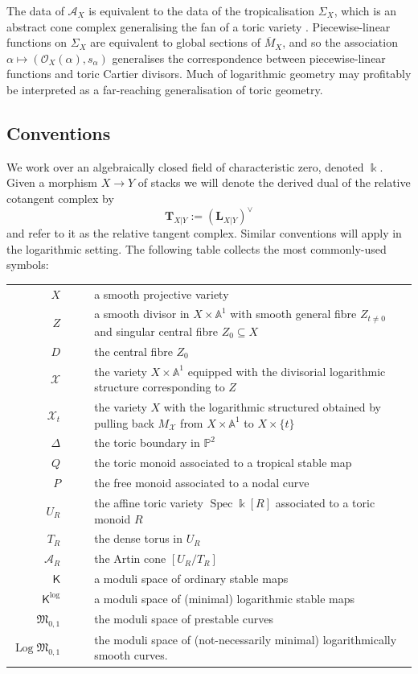 \documentclass[11pt]{amsart}
\theoremstyle{definition}
\theoremstyle{definition}
\newcommand{\LL}{\mathbf{L}}
\newcommand{\TT}{\mathbf{T}}
\newcommand{\Aaff}{\mathbb{A}}
\newcommand{\PP}{\mathbb{P}}
\newcommand{\OO}{\mathcal{O}}
\newcommand{\kfield}{\Bbbk}
\newcommand{\Acal}{\mathcal{A}}
\newcommand{\Xcal}{\mathcal{X}}
\newcommand{\Mfrak}{\mathfrak{M}}
\newcommand{\Kup}{\mathsf{K}}
\newcommand{\Log}{\operatorname{Log}}
\newcommand{\Spec}{\operatorname{Spec}}
\begin{document}
The data of $\Acal_X$ is equivalent to the data of the tropicalisation $\Sigma_X$, which is an abstract cone complex generalising the fan of a toric variety \cite{CavalieriChanUlirschWise}. Piecewise-linear functions on $\Sigma_X$ are equivalent to global sections of $\overline{M}_X$, and so the association $\alpha \mapsto (\OO_X(\alpha),s_\alpha)$ generalises the correspondence between piecewise-linear functions and toric Cartier divisors. Much of logarithmic geometry may profitably be interpreted as a far-reaching generalisation of toric geometry.

\subsection{Conventions} We work over an algebraically closed field of characteristic zero, denoted $\kfield$. Given a morphism $X \to Y$ of stacks we will denote the derived dual of the relative cotangent complex by
\begin{equation*} \TT_{X|Y} := (\LL_{X|Y})^\vee \end{equation*}
and refer to it as the relative tangent complex. Similar conventions will apply in the logarithmic setting. The following table collects the most commonly-used symbols:
\begin{center}
\begin{longtable}{r c c p{}}
$X$ & & & a smooth projective variety\\
$Z$ & & & a smooth divisor in $X \times \Aaff^{\! 1}$ with smooth general fibre $Z_{t \neq 0}$ and singular central fibre $Z_0 \subseteq X$ \\
$D$ & & & the central fibre $Z_0$\\
$\Xcal$ & & & the variety $X \times \Aaff^{\! 1}$ equipped with the divisorial logarithmic structure corresponding to $Z$\\
$\Xcal_t$ & & & the variety $X$ with the logarithmic structured obtained by pulling back $M_{\Xcal}$ from $X \times \Aaff^{\! 1}$ to $X \times \{t\}$\\
$\Delta$ & & & the toric boundary in $\PP^2$\\
$Q$ & & & the toric monoid associated to a tropical stable map\\
$P$ & & & the free monoid associated to a nodal curve \\
$U_R$ & & & the affine toric variety $\Spec \kfield[R]$ associated to a toric monoid $R$ \\
$T_R$ & & & the dense torus in $U_R$ \\
$\Acal_R$ & & & the Artin cone $[U_R/T_R]$\\
$\Kup$ & & & a moduli space of ordinary stable maps \\
$\Kup^{\log}$ & & & a moduli space of (minimal) logarithmic stable maps \\
$\Mfrak_{0,1}$ & & & the moduli space of prestable curves \\
$\Log\Mfrak_{0,1}$ & & & the moduli space of (not-necessarily minimal) logarithmically smooth curves.
\end{longtable}
\end{center}
\end{document}
